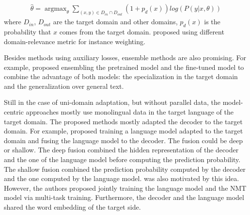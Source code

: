 \begin{equation}
\begin{array}{rcl}
\hat{\theta} = \displaystyle{\mathop{\arg max}_{\theta} \mathop{\sum}_{(x,y)\in D_{in} \cap D_{out}}} (1+p_d(x))log(P(y|x,\theta))
\end{array}
\end{equation}
where $D_{in}$, $D_{out}$ are the target domain and other domains, $p_d(x)$ is the probability that $x$ comes from the target domain. \citet{Wang17instance} proposed using different domain-relevance metric for instance weighting. 

Besides methods using auxiliary losses, ensemble methods are also promising. For example, \citet{Freitag16fast} proposed ensembling the pretrained model and the fine-tuned model to combine the advantage of both models: the specialization in the target domain and the generalization over general text.

Still in the case of uni-domain adaptation, but without parallel data, the model-centric approaches mostly use monolingual data in the target language of the target domain. The proposed methods mostly adapted the decoder to the target domain. For example, \citet{Gulcehre16monolingual} proposed training a language model adapted to the target domain and fusing the language model to the decoder. The fusion could be deep or shallow. The deep fusion combined the hidden representation of the decoder and the one of the language model before computing the prediction probability. The shallow fusion combined the prediction probability computed by the decoder and the one computed by the language model. \citet{Domhan17using} was also motivated by this idea. However, the authors proposed jointly training the language model and the NMT model via multi-task training. Furthermore, the decoder and the language model shared the word embedding of the target side.


